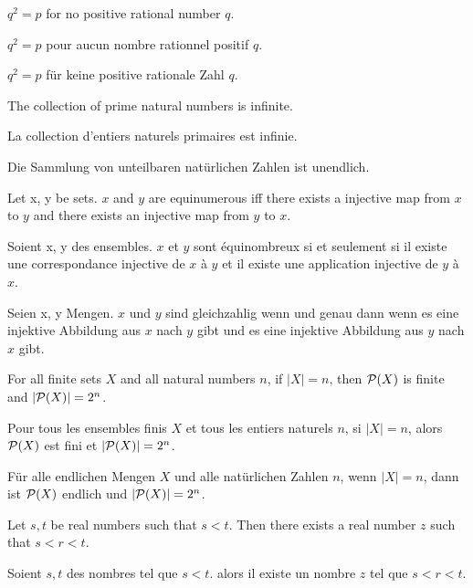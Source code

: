\documentclass{article}
\begin{document}
\setlength\parindent{0pt}

\newcommand{\Prod}[3]{#1_{#2} \cdots #1_{#3}}
\newcommand{\Seq}[2]{\{#1,\dots,#2\}}
\newcommand{\FinSet}[3]{\{#1_{#2},\dots,#1_{#3}\}}
\newcommand{\Primes}{\mathbb{P}}
\newcommand{\pow}{{\cal P}}
\newcommand{\range}{\operatorname{ran}}
\newcommand{\inv}[1]{#1^{-1}}
\newcommand{\sset}[2]{\{#1\}_{#2}}
\newcommand{\sumgeom}[2]{\sum_{0 \leq i < #2} {#1}^i}
\newcommand{\sumarith}[3]{\sum_{i = 1}^{#3}(#1 + #2 \cdot i)}

$ q^{2} = p $ for no positive rational number $ q $.

$ q^{2} = p $ pour aucun nombre rationnel positif $ q $.

$ q^{2} = p $ für keine positive rationale Zahl $ q $.


The collection of prime natural numbers is infinite.

La collection d'entiers naturels primaires est infinie.

Die Sammlung von unteilbaren natürlichen Zahlen ist unendlich.


Let x, y be sets. $ x $ and $ y $ are equinumerous iff there exists a injective map from $ x $ to $ y $ and there exists an injective map from $ y $ to $ x $.

Soient x, y des ensembles. $ x $ et $ y $ sont équinombreux si et seulement si il existe une correspondance injective de $ x $ à $ y $ et il existe une application injective de $ y $ à $ x $.

Seien x, y Mengen. $ x $ und $ y $ sind gleichzahlig wenn und genau dann wenn es eine injektive Abbildung aus $ x $ nach $ y $ gibt und es eine injektive Abbildung aus $ y $ nach $ x $ gibt.


For all finite sets $ X $ and all natural numbers $ n $, if $ |X| = n $, then $ \pow(X) $ is finite and $ |\pow(X)| = 2^{n} $.

Pour tous les ensembles finis $ X $ et tous les entiers naturels $ n $, si $ |X| = n $, alors $ \pow(X) $ est fini et $ |\pow(X)| = 2^{n} $.

Für alle endlichen Mengen $ X $ und alle natürlichen Zahlen $ n $, wenn $ |X| = n $, dann ist $ \pow(X) $ endlich und $ |\pow(X)| = 2^{n} $.


Let $ s, t $ be real numbers such that $ s < t $. Then there exists a real number $ z $ such that $ s < r < t $.

Soient $ s, t $ des nombres tel que $ s < t $. alors il existe un nombre $ z $ tel que $ s < r < t $.
\end{document}
